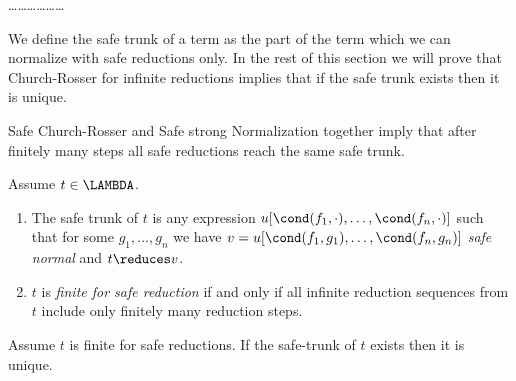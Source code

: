 \ldots\ldots\ldots\ldots\ldots\ldots


We define the safe trunk of a term as the part of the term which we can normalize with safe reductions only.
In the rest of this section we will
prove that Church-Rosser for infinite reductions implies that if the safe trunk exists then it is unique. 

Safe Church-Rosser and Safe strong Normalization together imply that after finitely many steps
all safe reductions reach the same safe trunk.

\begin{definition}
\label{definition-safe-trunk}
Assume $t \in \LAMBDA$.
\begin{enumerate}
\item
The safe trunk of $t$ is any expression $u[\cond(f_1,\cdot), \ldots, \cond(f_n,\cdot)]$
such that  for some $g_1, \ldots, g_n$ we have $v = u[\cond(f_1,g_1), \ldots, \cond(f_n,g_n)]$
\emph{safe normal} and $t \reduces v$.
\item
$t$ is \emph{finite for safe reduction} if and only if all infinite reduction sequences from $t$ 
include only finitely many  reduction steps.  
\end{enumerate}
\end{definition}


\begin{lemma}
\label{lemma-safe-trunk}
Assume $t$ is finite for safe reductions.
If the  safe-trunk of $t$ exists then it is unique. 
\end{lemma}


